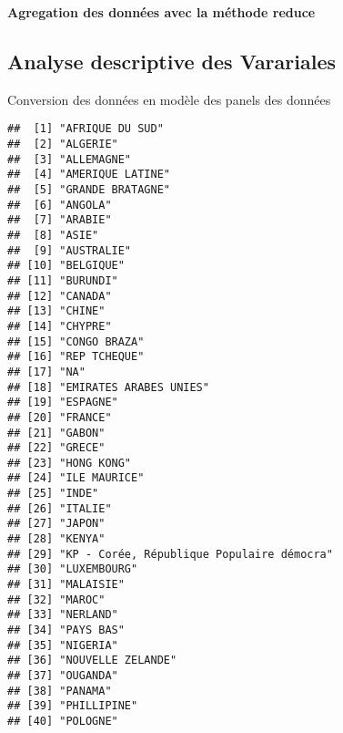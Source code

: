 \documentclass[
]{book}
\begin{document}
\textbf{Agregation des données avec la méthode reduce}

\hypertarget{analyse-descriptive-des-varariales}{%
\subsection{Analyse descriptive des Varariales}\label{analyse-descriptive-des-varariales}}

Conversion des données en modèle des panels des données

\begin{verbatim}
##  [1] "AFRIQUE DU SUD"                          
##  [2] "ALGERIE"                                 
##  [3] "ALLEMAGNE"                               
##  [4] "AMERIQUE LATINE"                         
##  [5] "GRANDE BRATAGNE"                         
##  [6] "ANGOLA"                                  
##  [7] "ARABIE"                                  
##  [8] "ASIE"                                    
##  [9] "AUSTRALIE"                               
## [10] "BELGIQUE"                                
## [11] "BURUNDI"                                 
## [12] "CANADA"                                  
## [13] "CHINE"                                   
## [14] "CHYPRE"                                  
## [15] "CONGO BRAZA"                             
## [16] "REP TCHEQUE"                             
## [17] "NA"                                      
## [18] "EMIRATES ARABES UNIES"                   
## [19] "ESPAGNE"                                 
## [20] "FRANCE"                                  
## [21] "GABON"                                   
## [22] "GRECE"                                   
## [23] "HONG KONG"                               
## [24] "ILE MAURICE"                             
## [25] "INDE"                                    
## [26] "ITALIE"                                  
## [27] "JAPON"                                   
## [28] "KENYA"                                   
## [29] "KP - Corée, République Populaire démocra"
## [30] "LUXEMBOURG"                              
## [31] "MALAISIE"                                
## [32] "MAROC"                                   
## [33] "NERLAND"                                 
## [34] "PAYS BAS"                                
## [35] "NIGERIA"                                 
## [36] "NOUVELLE ZELANDE"                        
## [37] "OUGANDA"                                 
## [38] "PANAMA"                                  
## [39] "PHILLIPINE"                              
## [40] "POLOGNE"                                 

\end{verbatim}
\end{document}

